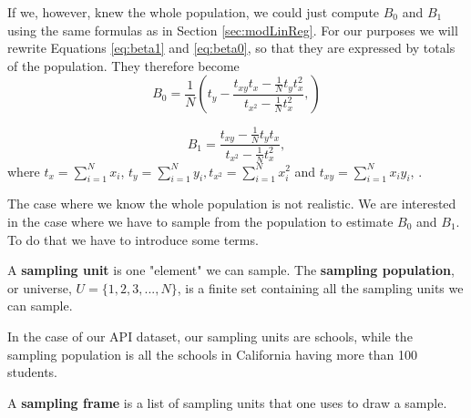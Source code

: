 \documentclass{article}
\begin{document}
If we, however, knew the whole population, we could just compute \(B_0\) and \(B_1\) using the same formulas
as in Section \ref{sec:modLinReg}. For our purposes we will rewrite Equations
\ref{eq:beta1} and \ref{eq:beta0},
so that they are expressed by totals of the population. They therefore become
\begin{equation} \label{eq:B0}
 B_0 = \frac{1}{N} \left( t_y - \frac{t_{xy} t_x - \frac{1}{N} t_y t_x^2}
   {t_{x^2} - \frac{1}{N} t_x^2},
  \right)
\end{equation}

\begin{equation} \label{eq:B1}
 B_1 = \frac{t_{xy} - \frac{1}{N} t_y t_x}
   {t_{x^2} - \frac{1}{N} t_x^2},
\end{equation}
where \(t_x = \sum_{i = 1}^N x_i\), \(t_y = \sum_{i = 1}^N y_i, t_{x^2} =
\sum_{i = 1}^N x_i^2\) and \(t_{xy} =
\sum_{i = 1}^N x_i y_i\), \cite[Chapter 11]{sampReg}.

The case where we know the whole population is not realistic. We are interested in the case where we have to sample from the
population to estimate \(B_0\) and \(B_1\). To do that we have to introduce some terms.


\begin{definition} \label{def:sampUnitPop}
 A \textbf{sampling unit} is one "element" we can sample.
 The \textbf{sampling population}, or universe, \(U = \{1, 2, 3, ..., N\}\), is a
 finite set containing all the sampling units we can sample.
\end{definition}

In the case of our API dataset, our sampling units are schools, while
the sampling population is all the schools in California having more than 100 students.

\begin{definition} \label{def:sampFrame}
 A \textbf{sampling frame} is a list of sampling units that one uses to draw a sample.
\end{definition}
\end{document}
